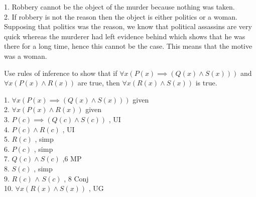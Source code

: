 \documentclass[a4paper]{exam}
\begin{document}
\begin{questions}
\begin{solution}
    1. Robbery cannot be the object of the murder because nothing was taken.\\
    2. If robbery is not the reason then the object is either politics or a woman.\\
     Supposing that politics was the reason, we know that political assassins are very quick whereas the murderer had left evidence behind which shows that he was there for a long time, hence this cannot be the case. This means that the motive was a woman. 
    
    
  \end{solution}
  
  \question Use rules of inference to show that if $\forall x(P(x) \implies (Q(x) \land S(x)))$ and $\forall x(P(x) \land R(x))$ are true, then $\forall x(R(x) \land S(x))$ is true.
  \begin{solution}
  
      1. $\forall x(P(x) \implies (Q(x) \land S(x)))$ \;given\\
      2. $\forall x(P(x) \land R(x))$ \;given\\
      3. $ P(c) \implies (Q(c) \land S(c))$ , UI\\
      4. $P(c) \land R(c)$ , UI\\
      5. $R(c)$ , simp\\
      6. $P(c)$ , simp\\
      7. $Q(c) \land S(c)$ ,6 MP\\
      8. $ S(c)$ , simp\\
      9. $R(c)$ $\land$ $S(c)$ , 8 Conj\\
      10. $\forall x(R(x) \land S(x))$ , UG
    \end{solution}

\end{questions}
\end{document}
